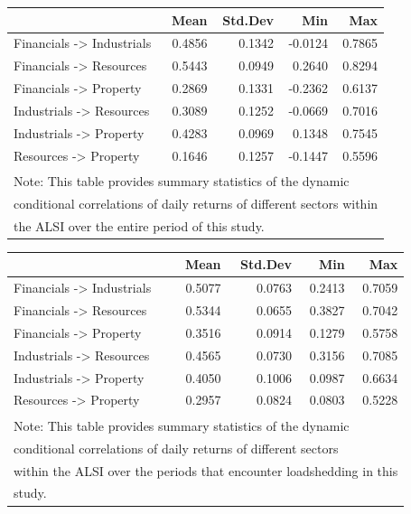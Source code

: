 \documentclass[11pt,preprint, authoryear]{elsarticle}
\let\origtable\table
\let\endorigtable\endtable
\renewenvironment{table}[1][2] {
    \expandafter\origtable\expandafter[H]
} {
    \endorigtable
}
\numberwithin{equation}{section}
\numberwithin{figure}{section}
\numberwithin{table}{section}
\begin{document}
\begin{table}

\caption{\label{tab:unnamed-chunk-10}Summary Statistics of DCC output for the Full Period \label{summstatdccfull}}
\centering
\fontsize{9}{11}\selectfont
\begin{tabular}[t]{l|r|r|r|r}
\hline
  & Mean & Std.Dev & Min & Max\\
\hline
Financials -> Industrials & 0.4856 & 0.1342 & -0.0124 & 0.7865\\
\hline
Financials -> Resources & 0.5443 & 0.0949 & 0.2640 & 0.8294\\
\hline
Financials -> Property & 0.2869 & 0.1331 & -0.2362 & 0.6137\\
\hline
Industrials -> Resources & 0.3089 & 0.1252 & -0.0669 & 0.7016\\
\hline
Industrials -> Property & 0.4283 & 0.0969 & 0.1348 & 0.7545\\
\hline
Resources -> Property & 0.1646 & 0.1257 & -0.1447 & 0.5596\\
\hline
\multicolumn{5}{l}{\textsuperscript{} Note: This table provides summary statistics of the dynamic}\\
\multicolumn{5}{l}{conditional correlations of daily returns of different sectors within}\\
\multicolumn{5}{l}{the ALSI over the entire period of this study.}\\
\end{tabular}
\end{table}

\begin{table}

\caption{\label{tab:unnamed-chunk-11}Summary Statistics of DCC output for Periods of Load-Shedding \label{summstatdccls}}
\centering
\fontsize{9}{11}\selectfont
\begin{tabular}[t]{l|r|r|r|r}
\hline
  & Mean & Std.Dev & Min & Max\\
\hline
Financials -> Industrials & 0.5077 & 0.0763 & 0.2413 & 0.7059\\
\hline
Financials -> Resources & 0.5344 & 0.0655 & 0.3827 & 0.7042\\
\hline
Financials -> Property & 0.3516 & 0.0914 & 0.1279 & 0.5758\\
\hline
Industrials -> Resources & 0.4565 & 0.0730 & 0.3156 & 0.7085\\
\hline
Industrials -> Property & 0.4050 & 0.1006 & 0.0987 & 0.6634\\
\hline
Resources -> Property & 0.2957 & 0.0824 & 0.0803 & 0.5228\\
\hline
\multicolumn{5}{l}{\textsuperscript{} Note: This table provides summary statistics of the dynamic}\\
\multicolumn{5}{l}{conditional correlations of daily returns of different sectors}\\
\multicolumn{5}{l}{within the ALSI over the periods that encounter loadshedding in this}\\
\multicolumn{5}{l}{study.}\\
\end{tabular}
\end{table}
\end{document}
